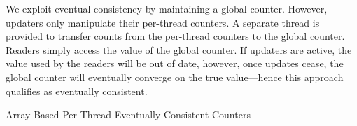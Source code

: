 We exploit eventual consistency by maintaining a global counter.
However, updaters only manipulate their per-thread counters.
A separate thread is provided to transfer counts from the per-thread
counters to the global counter.
Readers simply access the value of the global counter.
If updaters are active, the value used by the readers will be out of
date, however, once updates cease, the global counter will eventually
converge on the true value---hence this approach qualifies as
eventually consistent.

\fi

\begin{listing}[tbp]

\caption{Array-Based Per-Thread Eventually Consistent Counters}
\label{lst:count:Array-Based Per-Thread Eventually Consistent Counters}
\end{listing}

